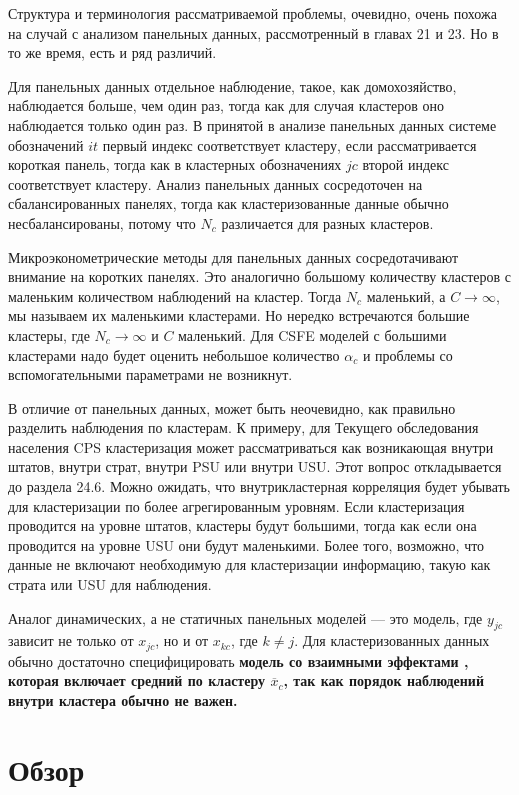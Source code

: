 Структура и терминология рассматриваемой проблемы, очевидно, очень похожа на случай с анализом панельных данных, рассмотренный в главах 21 и 23. Но в то же время, есть и ряд различий. 

Для панельных данных отдельное наблюдение, такое, как домохозяйство, наблюдается больше, чем один раз, тогда как для случая кластеров оно наблюдается только один раз. В принятой в анализе панельных данных системе обозначений $it$ первый индекс соответствует кластеру, если рассматривается короткая панель, тогда как в кластерных обозначениях $jc$ второй индекс соответствует кластеру. Анализ панельных данных сосредоточен на сбалансированных панелях, тогда как кластеризованные данные обычно несбалансированы, потому что $N_c$ различается для разных кластеров. 

Микроэконометрические методы для панельных данных сосредотачивают внимание на коротких панелях. Это аналогично большому количеству кластеров с маленьким количеством наблюдений на кластер. Тогда $N_c$ маленький, а $C \to \infty$, мы называем их маленькими кластерами. Но нередко встречаются большие кластеры, где $N_c \to \infty$ и $C$ маленький. Для CSFE моделей с большими кластерами надо будет оценить небольшое количество $\alpha_c$ и проблемы со вспомогательными параметрами не возникнут. 

В отличие от панельных данных, может быть неочевидно, как правильно разделить наблюдения по кластерам. К примеру, для Текущего обследования населения CPS кластеризация может рассматриваться как возникающая внутри штатов, внутри страт, внутри PSU или внутри USU. Этот вопрос откладывается до раздела 24.6. Можно ожидать, что внутрикластерная корреляция будет убывать для кластеризации по более агрегированным уровням. Если кластеризация проводится на уровне штатов, кластеры будут большими, тогда как если она проводится на уровне USU они будут маленькими. Более того, возможно, что данные не включают необходимую для кластеризации информацию, такую как страта или USU для наблюдения. 

Аналог динамических, а не статичных панельных моделей --- это модель, где $y_{jc}$ зависит не только от $x_{jc}$, но и от $x_{kc}$, где $k \ne j$. Для кластеризованных данных обычно достаточно специфицировать \bfseries модель со взаимными эффектами \mdseries, которая включает средний по кластеру $\overline{x}_c$, так как порядок наблюдений внутри кластера обычно не важен. 

\section*{Обзор}


